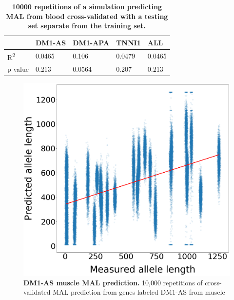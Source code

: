 \documentclass[10pt,letterpaper]{article}
\begin{document}
\begin{table}[!ht]
\begin{adjustwidth}{-2.25in}{0in} %
\centering
\caption{{\bf 10000 repetitions of a simulation predicting MAL from blood cross-validated with a testing set separate from the training set.}}

\begin{tabular}{|l|l|l|l|l|}
\hline
 & DM1-AS & DM1-APA & TNNI1 & ALL \\ \hline
R\textsuperscript{2} & 0.0465 & 0.106 & 0.0479 & 0.0465 \\ \hline
p-value & 0.213 & 0.0564 & 0.207 & 0.213 \\ \hline
\end{tabular}

\label{blood_results_table}
\end{adjustwidth}
\end{table}



\begin{figure}[!h]
 \includegraphics[width=\linewidth]{Nakamori_plot.png}
\caption{{\bf DM1-AS muscle MAL prediction.} 10,000 repetitions of cross-validated MAL prediction from genes labeled DM1-AS from muscle}
\label{fig1}
\end{figure}
\end{document}
